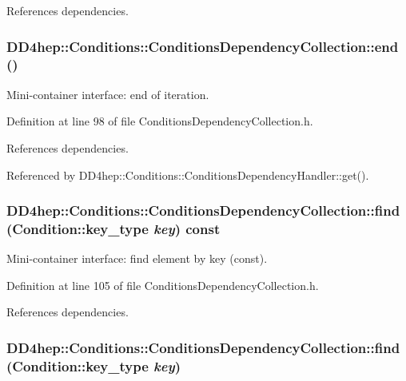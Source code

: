References dependencies.\hypertarget{class_d_d4hep_1_1_conditions_1_1_conditions_dependency_collection_a6c3a1c17490c6e6f1eece6b9fe3b0db9}{
\subsubsection[{end}]{ DD4hep::Conditions::ConditionsDependencyCollection::end ()}}
\label{class_d_d4hep_1_1_conditions_1_1_conditions_dependency_collection_a6c3a1c17490c6e6f1eece6b9fe3b0db9}


Mini-\/container interface: end of iteration. 

Definition at line 98 of file ConditionsDependencyCollection.h.

References dependencies.

Referenced by DD4hep::Conditions::ConditionsDependencyHandler::get().\hypertarget{class_d_d4hep_1_1_conditions_1_1_conditions_dependency_collection_a88c83a2c527d746502b8c0bf79142e8f}{
\subsubsection[{find}]{ DD4hep::Conditions::ConditionsDependencyCollection::find ({\bf Condition::key\_\-type} {\em key}) const}}
\label{class_d_d4hep_1_1_conditions_1_1_conditions_dependency_collection_a88c83a2c527d746502b8c0bf79142e8f}


Mini-\/container interface: find element by key (const). 

Definition at line 105 of file ConditionsDependencyCollection.h.

References dependencies.\hypertarget{class_d_d4hep_1_1_conditions_1_1_conditions_dependency_collection_aa1ab8e6418ce818e247ac52baf25bf5e}{
\subsubsection[{find}]{ DD4hep::Conditions::ConditionsDependencyCollection::find ({\bf Condition::key\_\-type} {\em key})}}
\label{class_d_d4hep_1_1_conditions_1_1_conditions_dependency_collection_aa1ab8e6418ce818e247ac52baf25bf5e}


